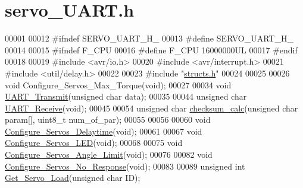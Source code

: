 \hypertarget{servo___u_a_r_t_8h_source}{}\section{servo\+\_\+\+U\+A\+R\+T.\+h}
\label{servo___u_a_r_t_8h_source}

\begin{DoxyCode}
00001 
00012 \textcolor{preprocessor}{#ifndef SERVO\_UART\_H\_}
00013 \textcolor{preprocessor}{#define SERVO\_UART\_H\_}
00014 
00015 \textcolor{preprocessor}{#ifndef F\_CPU}
00016 \textcolor{preprocessor}{#define F\_CPU 16000000UL    }
00017 \textcolor{preprocessor}{#endif}
00018 
00019 \textcolor{preprocessor}{#include <avr/io.h>}
00020 \textcolor{preprocessor}{#include <avr/interrupt.h>}
00021 \textcolor{preprocessor}{#include <util/delay.h>}
00022 
00023 \textcolor{preprocessor}{#include "\hyperlink{structs_8h}{structs.h}"}
00024 
00025 
00026 \textcolor{keywordtype}{void} Configure\_Servos\_Max\_Torque(\textcolor{keywordtype}{void});
00027 
00034 \textcolor{keywordtype}{void} \hyperlink{servo___u_a_r_t_8h_af34dbb08e8f6cfc1a58d9b7f2b81f455}{UART\_Transmit}(\textcolor{keywordtype}{unsigned} \textcolor{keywordtype}{char} data);
00035 
00044 \textcolor{keywordtype}{unsigned} \textcolor{keywordtype}{char} \hyperlink{servo___u_a_r_t_8h_a45145cd104fed6e8dff8dd62ee52ebe7}{UART\_Receive}(\textcolor{keywordtype}{void});
00045 
00054 \textcolor{keywordtype}{unsigned} \textcolor{keywordtype}{char} \hyperlink{servo___u_a_r_t_8h_a45e02356d032e2069888899bf1a987bf}{checksum\_calc}(\textcolor{keywordtype}{unsigned} \textcolor{keywordtype}{char} param[], uint8\_t num\_of\_par);
00055 
00056 
00060 \textcolor{keywordtype}{void} \hyperlink{servo___u_a_r_t_8h_a7522eb3c86cfa713aade9cbe082bcbba}{Configure\_Servos\_Delaytime}(\textcolor{keywordtype}{void});
00061 
00067 \textcolor{keywordtype}{void} \hyperlink{servo___u_a_r_t_8h_ae7bfd5ff29686df194ec9f4e310cf2e4}{Configure\_Servos\_LED}(\textcolor{keywordtype}{void});
00068 
00075 \textcolor{keywordtype}{void} \hyperlink{servo___u_a_r_t_8h_aa6bb8d88629b6d2a6c18e2e0d8909574}{Configure\_Servos\_Angle\_Limit}(\textcolor{keywordtype}{void});
00076 
00082 \textcolor{keywordtype}{void} \hyperlink{servo___u_a_r_t_8h_a17e89f3d8b4abe3abe352ffba8b684f1}{Configure\_Servos\_No\_Response}(\textcolor{keywordtype}{void});
00083 
00089 \textcolor{keywordtype}{unsigned} \textcolor{keywordtype}{int} \hyperlink{servo___u_a_r_t_8h_a1aae94381111766cdccb93eae5b5c382}{Get\_Servo\_Load}(\textcolor{keywordtype}{unsigned} \textcolor{keywordtype}{char} ID);

\end{DoxyCode}
